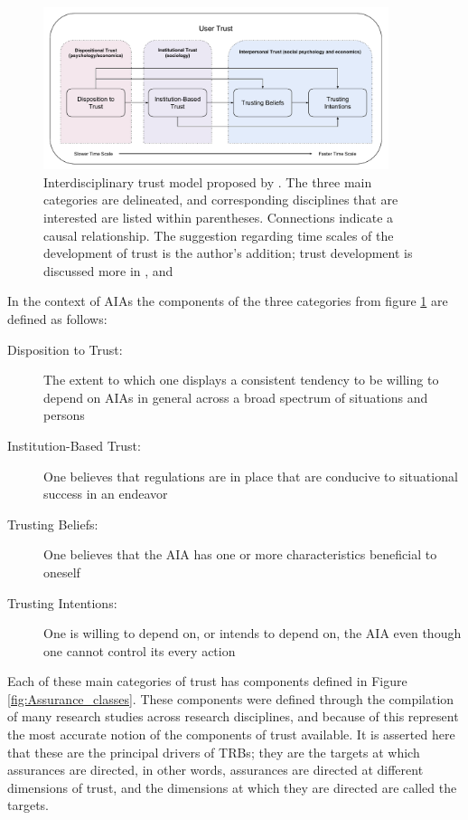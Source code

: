         \begin{figure}[htbp]
            \centering
            \includegraphics[width=0.9\textwidth]{Figures/UserTrust}
            \caption{Interdisciplinary trust model proposed by \citet{McKnight2001-fa}. The three main categories are delineated, and corresponding disciplines that are interested are listed within parentheses. Connections indicate a causal relationship. The suggestion regarding time scales of the development of trust is the author's addition; trust development is discussed more in \cite{Lewicki2006-gp}, and \cite{Lewicki2006-hj}}
            \label{fig:UserTrust}
        \end{figure}

        In the context of AIAs the components of the three categories from figure \ref{fig:UserTrust} are defined as follows:

        \begin{description}
            \item [Disposition to Trust:] The extent to which one displays a consistent tendency to be willing to depend on AIAs in general across a broad spectrum of situations and persons
            \item [Institution-Based Trust:] One believes that regulations are in place that are conducive to situational success in an endeavor
            \item [Trusting Beliefs:] One believes that the AIA has one or more characteristics beneficial to oneself
            \item [Trusting Intentions:] One is willing to depend on, or intends to depend on, the AIA even though one cannot control its every action
        \end{description}

        Each of these main categories of trust has components defined in Figure \ref{fig:Assurance_classes}. These components were defined through the compilation of many research studies across research disciplines, and because of this represent the most accurate notion of the components of trust available. It is asserted here that these are the principal drivers of TRBs; they are the targets at which assurances are directed, in other words, assurances are directed at different dimensions of trust, and the dimensions at which they are directed are called the targets.

